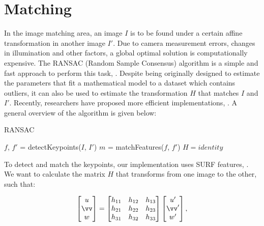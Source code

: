 \documentclass[12pt]{article}
\begin{document}
\FloatBarrier %
\section{Matching}

In the image matching area, an image $I$ is to be found under a certain affine transformation in another image $I'$.
Due to camera measurement errors, changes in illumination and other factors, a global optimal solution is computationally expensive.
The RANSAC (Random Sample Consensus) algorithm is a simple and fast approach to perform this task, \cite{Fischler1981}.
Despite being originally designed to estimate the parameters that fit a mathematical model to a dataset which contains outliers, it can also be used to estimate the transformation $H$ that matches $I$ and $I'$.
Recently, researchers have proposed more efficient implementations, \cite{Dung2013}.
A general overview of the algorithm is given below:

\begin{algorithm}[H]
 \caption{RANSAC}
 $f$, $f'$ = detectKeypoints($I$, $I'$)\;
 $m$ = matchFeatures($f$, $f'$)\;
 $H = identity$\;
\end{algorithm}

To detect and match the keypoints, our implementation uses SURF features, \cite{Bay2006}.
We want to calculate the matrix $H$ that transforms from one image to the other, such that:

\begin{equation}
\begin{bmatrix}
u \\ 
\vv \\ 
w
\end{bmatrix}
= 
\begin{bmatrix}
 h_{11} & h_{12} & h_{13} \\ 
 h_{21} & h_{22} & h_{23}\\ 
 h_{31} & h_{32} & h_{33}
\end{bmatrix}
\begin{bmatrix}
u' \\
\vv' \\
w'
\end{bmatrix},
\label{eq:originalH}
\end{equation}
\end{document}
